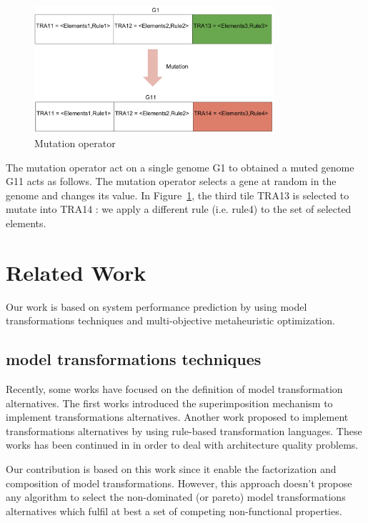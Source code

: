\documentclass[conference]{IEEEtran}
\begin{document}
\begin{figure}[!ht]
\centering
\includegraphics[width=3.49in]{mutation.pdf}
\caption{Mutation operator}
\label{mutation}
\end{figure}

The mutation operator act on a single genome G1 to obtained a muted genome G11 acts as follows. The mutation operator selects a gene at random in the genome and changes its value. In Figure~\ref{mutation}, the third tile TRA13 is selected to mutate into TRA14 : we apply a different rule (i.e. rule4) to the set of selected elements.

\section{Related Work}
\label{Related}
Our work is based on system performance prediction\cite{1291833} by using model transformations techniques and multi-objective metaheuristic optimization\cite{Coello98acomprehensive}.

\subsection{model transformations techniques}
Recently, some works have focused on the definition of model transformation alternatives. The first works introduced the superimposition mechanism\cite{Navarro:2011:UMT:2041790.2041840} to implement transformations alternatives. Another work\cite{Kavimandan:2011:MQS:2000259.2000264} proposed to implement transformations alternatives by using rule-based transformation languages. These works has been continued in\cite{Drago:2011} in order to deal with architecture quality problems. 

Our contribution is based on this work since it enable the factorization and composition of model transformations. However, this approach doesn't propose any algorithm to select the non-dominated (or pareto) model transformations alternatives which fulfil at best a set of competing non-functional properties.
\end{document}
